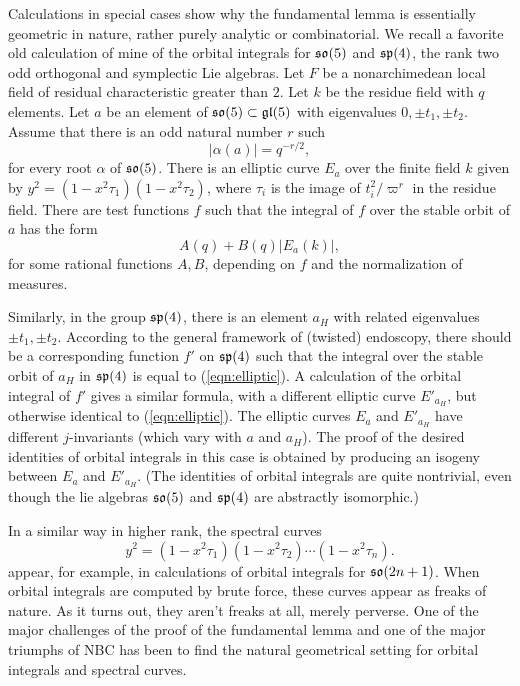 \documentclass[brochure,english,12pt]{bourbaki}
\def\so{\frak{so}}
\def\sp{\frak{sp}}
\def\gl{\frak{gl}}
\begin{document}
Calculations in special cases show why the fundamental lemma is
essentially geometric in nature, rather purely analytic or
combinatorial. We recall a favorite old calculation of mine of the
orbital integrals for $\so(5)$ and $\sp(4)$, the rank two odd
orthogonal and symplectic Lie algebras.  Let $F$ be a nonarchimedean
local field of residual characteristic greater than $2$.  Let $k$ be
the residue field with $q$ elements.  Let $a$ be an element of
$\so(5)\subset \gl(5)$ with eigenvalues $0,\pm t_1,\pm t_2$.  Assume
that there is an odd natural number $r$ such
\[
|\alpha(a)| = q^{-r/2},
\]
for every root $\alpha$ of $\so(5)$. 
There is an elliptic curve $E_a$ over the finite field $k$ given by
$y^2 = (1-x^2\tau_1)(1-x^2\tau_2)$, where $\tau_i$ is the image
of $t_i^2/\varpi^r$ in the residue field.  There are test functions $f$ 
such that the integral of $f$ over the stable orbit
of $a$ has the form
\begin{equation}\label{eqn:elliptic}
A(q) + B(q) | E_a(k)|,
\end{equation}
for some rational functions $A,B$, depending on $f$ and the normalization of measures.

Similarly, in the group $\sp(4)$, there is an element ${a_H}$ with related eigenvalues $\pm
t_1,\pm t_2$.  According to the general framework of (twisted) endoscopy, there
should be a corresponding function $f'$ on $\sp(4)$ such that the
integral over the stable orbit of ${a_H}$ in $\sp(4)$ is equal to
(\ref{eqn:elliptic}).  A calculation of the orbital integral of $f'$ gives a similar formula, with
a different elliptic curve $E'_{a_H}$, but otherwise identical to (\ref{eqn:elliptic}).
The elliptic curves $E_a$ and $E'_{a_H}$
have different $j$-invariants (which vary with $a$ and ${a_H}$).  The
proof of the desired identities of orbital integrals in this case is
obtained by producing an isogeny between $E_a$ and $E'_{a_H}$.  (The identities of orbital integrals are quite
nontrivial, even though the lie algebras $\so(5)$ and $\sp(4)$ are abstractly isomorphic.)

In a similar way in higher rank,  the spectral curves
\[
y^2 = (1-x^2 \tau_1)(1-x^2 \tau_2)\cdots (1-x^2 \tau_n).
\]
appear, for example, in calculations of orbital integrals for
$\so(2n+1)$.  When orbital integrals are computed by brute force,
these curves appear as freaks of nature.  As it turns
out, they aren't freaks at all, merely perverse.  One of the major
challenges of the proof of the fundamental lemma and one of the major
triumphs of NBC has been to find the natural geometrical setting for
orbital integrals and spectral curves.
\end{document}
